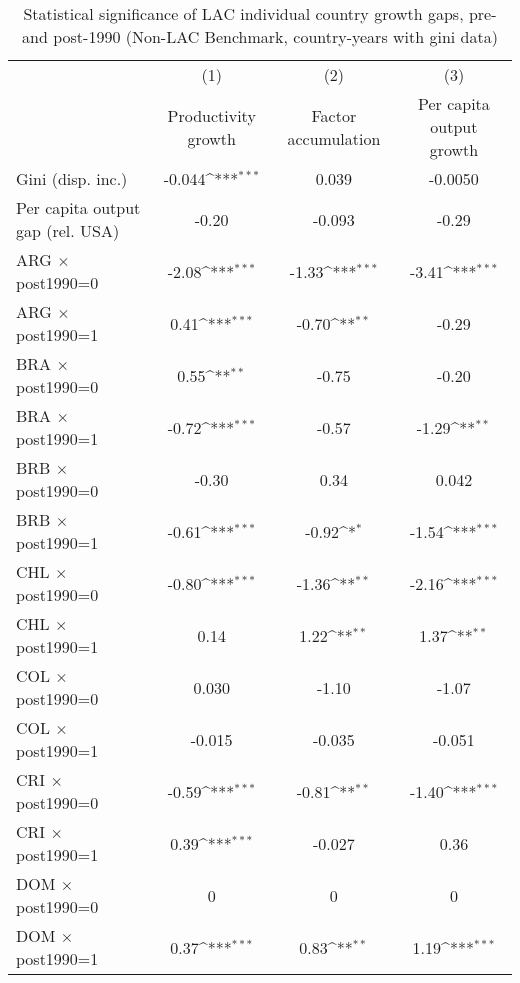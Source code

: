 \begin{sidewaystable}[htbp]\centering
\def\sym#1{\ifmmode^{#1}\else\(^{#1}\)\fi}
\caption{Statistical significance of LAC individual country growth gaps, pre- and post-1990 (Non-LAC Benchmark, country-years with gini data)}
\begin{tabular}{l*{3}{c}}
\toprule
                &\multicolumn{1}{c}{(1)}&\multicolumn{1}{c}{(2)}&\multicolumn{1}{c}{(3)}\\
                &\multicolumn{1}{c}{Productivity growth}&\multicolumn{1}{c}{Factor accumulation}&\multicolumn{1}{c}{Per capita output growth}\\
\midrule
Gini (disp. inc.)&   -0.044\sym{***}&    0.039         &  -0.0050         \\
Per capita output gap (rel. USA)&    -0.20         &   -0.093         &    -0.29         \\
ARG $\times$ post1990=0&    -2.08\sym{***}&    -1.33\sym{***}&    -3.41\sym{***}\\
ARG $\times$ post1990=1&     0.41\sym{***}&    -0.70\sym{**} &    -0.29         \\
BRA $\times$ post1990=0&     0.55\sym{**} &    -0.75         &    -0.20         \\
BRA $\times$ post1990=1&    -0.72\sym{***}&    -0.57         &    -1.29\sym{**} \\
BRB $\times$ post1990=0&    -0.30         &     0.34         &    0.042         \\
BRB $\times$ post1990=1&    -0.61\sym{***}&    -0.92\sym{*}  &    -1.54\sym{***}\\
CHL $\times$ post1990=0&    -0.80\sym{***}&    -1.36\sym{**} &    -2.16\sym{***}\\
CHL $\times$ post1990=1&     0.14         &     1.22\sym{**} &     1.37\sym{**} \\
COL $\times$ post1990=0&    0.030         &    -1.10         &    -1.07         \\
COL $\times$ post1990=1&   -0.015         &   -0.035         &   -0.051         \\
CRI $\times$ post1990=0&    -0.59\sym{***}&    -0.81\sym{**} &    -1.40\sym{***}\\
CRI $\times$ post1990=1&     0.39\sym{***}&   -0.027         &     0.36         \\
DOM $\times$ post1990=0&        0         &        0         &        0         \\
DOM $\times$ post1990=1&     0.37\sym{***}&     0.83\sym{**} &     1.19\sym{***}\\

\end{tabular}
\end{sidewaystable}
